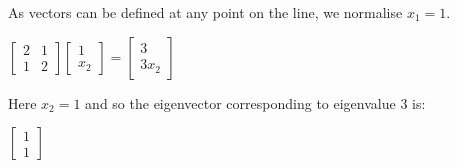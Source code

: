 As vectors can be defined at any point on the line, we normalise \(x_1=1\).

$\begin{bmatrix}2&1\\1 & 2\end{bmatrix}\begin{bmatrix}1\\x_2\end{bmatrix}=\begin{bmatrix}3\\3x_2\end{bmatrix}$

Here \(x_2=1\) and so the eigenvector corresponding to eigenvalue \(3\) is:

$\begin{bmatrix}1\\1\end{bmatrix}$

